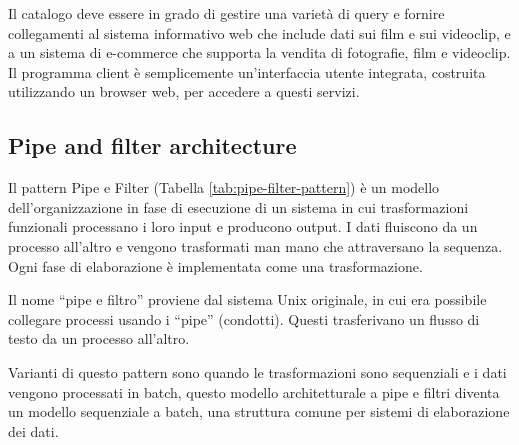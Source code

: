 Il catalogo deve essere in grado di gestire una varietà di query e fornire collegamenti al sistema informativo web che include dati sui film e sui videoclip, e a un sistema di e-commerce che supporta la vendita di fotografie, film e videoclip. Il programma client è semplicemente un'interfaccia utente integrata, costruita utilizzando un browser web, per accedere a questi servizi.

\subsection{Pipe and filter architecture}
Il pattern Pipe e Filter (Tabella \ref{tab:pipe-filter-pattern}) è un modello dell’organizzazione in fase di esecuzione di un sistema in cui trasformazioni funzionali processano i loro input e producono output. I dati fluiscono da un processo all’altro e vengono trasformati man mano che attraversano la sequenza. Ogni fase di elaborazione è implementata come una trasformazione.

Il nome “pipe e filtro” proviene dal sistema Unix originale, in cui era possibile collegare processi usando i “pipe” (condotti). Questi trasferivano un flusso di testo da un processo all’altro.

Varianti di questo pattern sono quando le trasformazioni sono sequenziali e i dati vengono processati in batch, questo modello architetturale a pipe e filtri diventa un modello sequenziale a batch, una struttura comune per sistemi di elaborazione dei dati.


